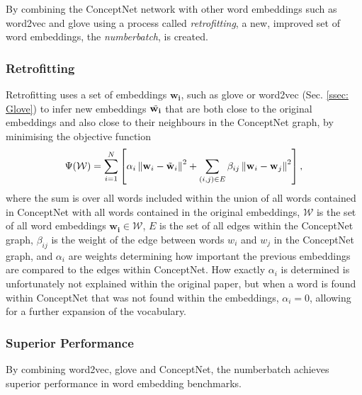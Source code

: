         By combining the ConceptNet network with other word \glspl{embedding} such as word2vec and \gls{glove} using a process called \textit{retrofitting}, a new, improved set of word \glspl{embedding}, the \textit{\gls{numberbatch}}, is created.

        \subsubsection{Retrofitting}
            Retrofitting uses a set of \glspl{embedding} $\mathbf{w_i}$, such as \gls{glove} or word2vec (Sec. \ref{ssec: Glove}) to infer new \glspl{embedding} $\Tilde{\mathbf{w_i}}$ that are both close to the original \glspl{embedding} and also close to their neighbours in the ConceptNet graph, by minimising the objective function
            \begin{equation}
                \Psi(\mathcal{W})=\sum_{i=1}^{N}\left[\alpha_{i}\left\|\mathbf{w}_{i}-\Tilde{\mathbf{w}}_{i}\right\|^{2}+\sum_{(i, j) \in E} \beta_{i j}\left\|\mathbf{w}_{i}-\mathbf{w}_{j}\right\|^{2}\right],
            \end{equation}
            where the sum is over all words included within the union of all words contained in ConceptNet with all words contained in the original \glspl{embedding}, $\mathcal{W}$ is the set of all word \glspl{embedding} $\mathbf{w_i} \in \mathcal{W}$, $E$ is the set of all edges within the ConceptNet graph, $\beta_{ij}$ is the weight of the edge between words $w_i$ and $w_j$ in the ConceptNet graph, and $\alpha_i$ are weights determining how important the previous \glspl{embedding} are compared to the edges within ConceptNet. How exactly $\alpha_i$ is determined is unfortunately not explained within the original paper, but when a word is found within ConceptNet that was not found within the \glspl{embedding}, $\alpha_i = 0$, allowing for a further expansion of the vocabulary.\cite{speer2017conceptnet}

        \subsubsection{Superior Performance}
            By combining word2vec, \gls{glove} and ConceptNet, the \gls{numberbatch} achieves superior performance in word \gls{embedding} benchmarks\cite{speer2017conceptnet, conceptnetPerformance}.



